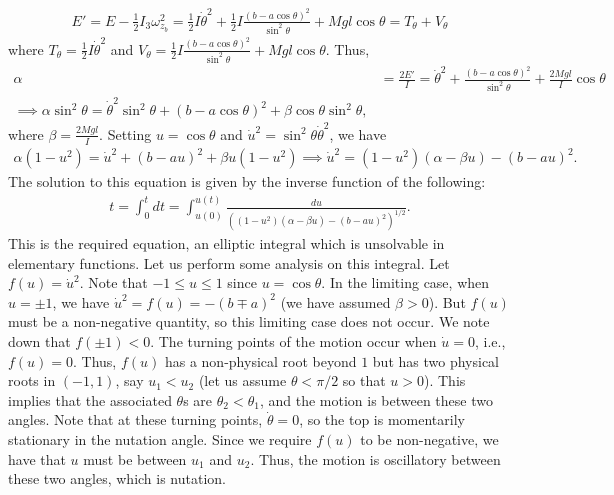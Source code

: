 \begin{align}
    E' = E - \frac{1}{2} I_{3} \omega_{z_{b}}^{2} = \frac{1}{2} I \dot{\theta}^{2} + \frac{1}{2} I \frac{(b-a\cos\theta)^{2}}{\sin^{2}\theta} + Mgl \cos \theta = T_{\theta} + V_{\theta}
\end{align}
where $T_{\theta} = \frac{1}{2} I \dot{\theta}^{2}$ and $V_{\theta} = \frac{1}{2} I \frac{(b-a\cos\theta)^{2}}{\sin^{2}\theta} + Mgl \cos \theta$. Thus,
\begin{align}
    \alpha &= \frac{2E'}{I} = \dot{\theta}^{2} + \frac{(b-a\cos\theta)^{2}}{\sin^{2}\theta} + \frac{2Mgl}{I} \cos \theta \\
    \implies \alpha \sin^{2} \theta = \dot{\theta}^{2} \sin^{2} \theta + (b-a\cos\theta)^{2} + \beta \cos \theta \sin^{2} \theta,
\end{align}
where $\beta = \frac{2Mgl}{I}$. Setting $u = \cos \theta$ and $\dot{u}^{2} = \sin^{2} \theta \dot{\theta}^{2}$, we have
\begin{align}
    \alpha (1-u^{2}) = \dot{u}^{2} + (b-au)^{2} + \beta u (1-u^{2}) \implies \dot{u}^{2} = (1-u^{2})(\alpha-\beta u) - (b-au)^{2}.
\end{align}
The solution to this equation is given by the inverse function of the following:
\begin{align}
    t = \int_{0}^{t} dt = \int_{u(0)}^{u(t)} \frac{du}{((1-u^{2})(\alpha - \beta u) - (b-au)^{2})^{1/2}}.
\end{align}
This is the required equation, an elliptic integral which is unsolvable in elementary functions. Let us perform some analysis on this integral. Let $f(u) = \dot{u}^{2}$. Note that $-1 \leq u \leq 1$ since $u = \cos \theta$. In the limiting case, when $u = \pm 1$, we have $\dot{u}^{2} = f(u) = -(b \mp a)^{2}$ (we have assumed $\beta > 0$). But $f(u)$ must be a non-negative quantity, so this limiting case does not occur. We note down that $f(\pm 1) < 0$. The turning points of the motion occur when $\dot{u} = 0$, i.e., $f(u) = 0$. Thus, $f(u)$ has a non-physical root beyond $1$ but has two physical roots in $(-1,1)$, say $u_{1} < u_{2}$ (let us assume $\theta < \pi/2$ so that $u > 0$). This implies that the associated $\theta$s are $\theta_{2} < \theta_{1}$, and the motion is between these two angles. Note that at these turning points, $\dot{\theta} = 0$, so the top is momentarily stationary in the nutation angle. Since we require $f(u)$ to be non-negative, we have that $u$ must be between $u_{1}$ and $u_{2}$. Thus, the motion is oscillatory between these two angles, which is nutation.